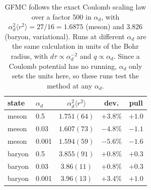 \begin{table}[t]
\centering
\begin{tabular}{llccc}
\hline\hline
state & $\alpha_d$ & $\alpha_d^2\langle r^2\rangle$ & dev. & pull\\
\hline
meson & 0.5 & $1.751(64)$ & $+3.8\%$ & $+1.0$\\
meson & 0.03 & $1.607(73)$ & $-4.8\%$ & $-1.1$\\
meson & 0.001 & $1.594(59)$ & $-5.6\%$ & $-1.6$\\
baryon & 0.5 & $3.855(91)$ & $+0.8\%$ & $+0.3$\\
baryon & 0.03 & $3.86(11)$ & $+0.8\%$ & $+0.3$\\
baryon & 0.001 & $3.96(13)$ & $+3.4\%$ & $+1.0$\\
\hline\hline
\end{tabular}
\caption{GFMC follows the exact Coulomb scaling law over a factor 500 in $\alpha_d$, with
$\alpha_d^2\langle r^2\rangle=27/16=1.6875$ (meson) and $3.826$ (baryon, variational).
Runs at different $\alpha_d$ are the same calculation in units of the Bohr radius, with
$d\tau\propto\alpha_d^{-2}$ and $q\propto\alpha_d$. Since a Coulomb potential has no running, $\alpha_d$ only sets
the units here, so these runs test the method at any $\alpha_d$.}
\label{tab:coulval}
\end{table}
